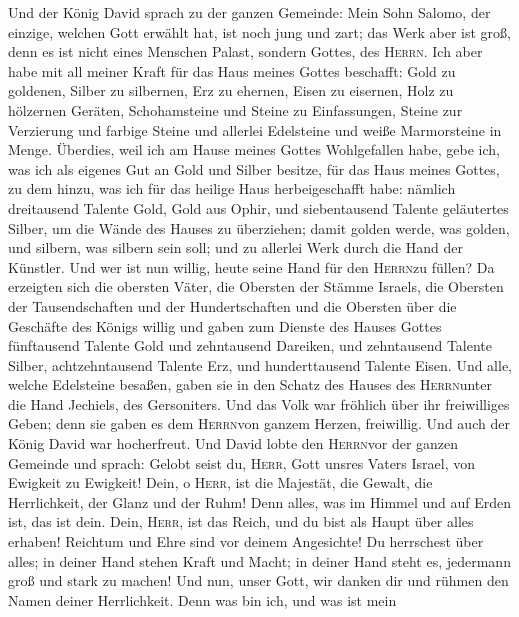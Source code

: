  Und der König David sprach zu der ganzen Gemeinde: Mein
Sohn Salomo, der einzige, welchen Gott erwählt hat, ist noch jung und
zart; das Werk aber ist groß, denn es ist nicht eines Menschen Palast,
sondern Gottes, des \textsc{Herrn}.  Ich aber habe mit all
meiner Kraft für das Haus meines Gottes beschafft: Gold zu goldenen,
Silber zu silbernen, Erz zu ehernen, Eisen zu eisernen, Holz zu
hölzernen Geräten, Schohamsteine und Steine zu Einfassungen, Steine zur
Verzierung und farbige Steine und allerlei Edelsteine und weiße
Marmorsteine in Menge.  Überdies, weil ich am Hause meines
Gottes Wohlgefallen habe, gebe ich, was ich als eigenes Gut an Gold und
Silber besitze, für das Haus meines Gottes, zu dem hinzu, was ich für
das heilige Haus herbeigeschafft habe:  nämlich
dreitausend Talente Gold, Gold aus Ophir, und siebentausend Talente
geläutertes Silber, um die Wände des Hauses zu überziehen;
 damit golden werde, was golden, und silbern, was silbern
sein soll; und zu allerlei Werk durch die Hand der Künstler. Und wer ist
nun willig, heute seine Hand für den \textsc{Herrn}zu füllen?
 Da erzeigten sich die obersten Väter, die Obersten der
Stämme Israels, die Obersten der Tausendschaften und der Hundertschaften
und die Obersten über die Geschäfte des Königs willig  und
gaben zum Dienste des Hauses Gottes fünftausend Talente Gold und
zehntausend Dareiken, und zehntausend Talente Silber, achtzehntausend
Talente Erz, und hunderttausend Talente Eisen.  Und alle,
welche Edelsteine besaßen, gaben sie in den Schatz des Hauses des
\textsc{Herrn}unter die Hand Jechiels, des Gersoniters. 
Und das Volk war fröhlich über ihr freiwilliges Geben; denn sie gaben es
dem \textsc{Herrn}von ganzem Herzen, freiwillig. Und auch der König
David war hocherfreut.  Und David lobte den
\textsc{Herrn}vor der ganzen Gemeinde und sprach: Gelobt seist du,
\textsc{Herr}, Gott unsres Vaters Israel, von Ewigkeit zu Ewigkeit!
 Dein, o \textsc{Herr}, ist die Majestät, die Gewalt, die
Herrlichkeit, der Glanz und der Ruhm! Denn alles, was im Himmel und auf
Erden ist, das ist dein. Dein, \textsc{Herr}, ist das Reich, und du bist
als Haupt über alles erhaben!  Reichtum und Ehre sind vor
deinem Angesichte! Du herrschest über alles; in deiner Hand stehen Kraft
und Macht; in deiner Hand steht es, jedermann groß und stark zu machen!
 Und nun, unser Gott, wir danken dir und rühmen den Namen
deiner Herrlichkeit.  Denn was bin ich, und was ist mein
